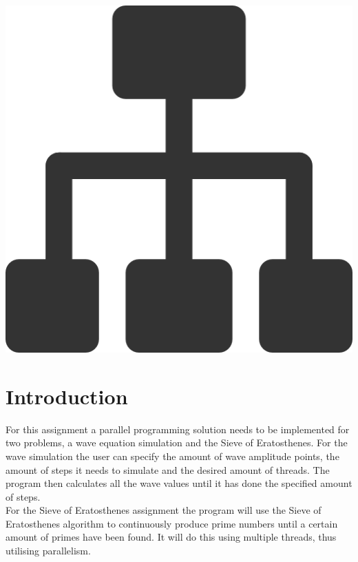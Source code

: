 \documentclass[a4paper,12px]{article}
\begin{document}
\vspace{2cm}
\begin{center}
    \includegraphics[width=(\textwidth/5*3)]{parallel_tasks}
\end{center}
\clearpage

\tableofcontents
\vspace{1cm}


\section{Introduction}

For this assignment a parallel programming solution needs to be implemented for
two problems, a wave equation simulation and the Sieve of Eratosthenes. For the
wave simulation the user can specify the amount of wave amplitude points, the
amount of steps it needs to simulate and the desired amount of threads. The
program then calculates all the wave values until it has done the specified
amount of steps.\\
For the Sieve of Eratosthenes assignment the program will use the Sieve of
Eratosthenes algorithm to continuously produce prime numbers until a certain
amount of primes have been found. It will do this using multiple threads, thus
utilising parallelism.
\end{document}
